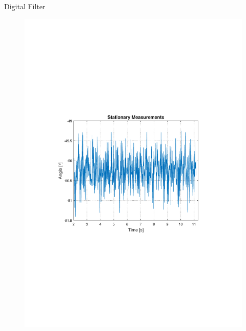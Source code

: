 \begin{frame}{Digital Filter}{}
\vspace{-4cm}
  \begin{figure}
  \hspace{-.8cm}
    	\includegraphics[scale = .5]{Pictures/StationaryMeasurements.pdf}
  \end{figure}
\end{frame}

